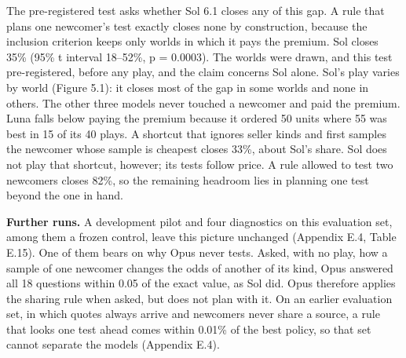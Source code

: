 The pre-registered test asks whether Sol 6.1 closes any of this gap. A rule that plans one newcomer's test exactly
closes none by construction, because the inclusion criterion keeps only worlds in which it pays the premium. Sol
closes 35\% (95\% t interval 18--52\%, p = 0.0003). The worlds were drawn, and this test pre-registered, before any play, and the claim concerns Sol
alone. Sol's play varies by world (Figure 5.1): it closes most of the gap in some worlds and none in others. The
other three models never touched a newcomer and paid the premium. Luna falls below paying the premium because it
ordered 50 units where 55 was best in 15 of its 40 plays. A shortcut that ignores seller kinds and first samples the
newcomer whose sample is cheapest closes 33\%, about Sol's share. Sol does not play that shortcut, however; its tests
follow price. A rule allowed to test two newcomers closes 82\%, so the remaining headroom lies in planning one test
beyond the one in hand.

\textbf{Further runs.} A development pilot and four diagnostics on this evaluation set, among them a frozen
control, leave this picture unchanged (Appendix E.4, Table E.15). One of them bears on why Opus never tests. Asked,
with no play, how a sample of one newcomer changes the odds of another of its kind, Opus answered all 18 questions
within 0.05 of the exact value, as Sol did. Opus therefore applies the sharing rule when asked, but does not plan with
it. On an earlier evaluation set, in which quotes always arrive and newcomers never share a source, a rule that looks
one test ahead comes within 0.01\% of the best policy, so that set cannot separate the models (Appendix E.4).

